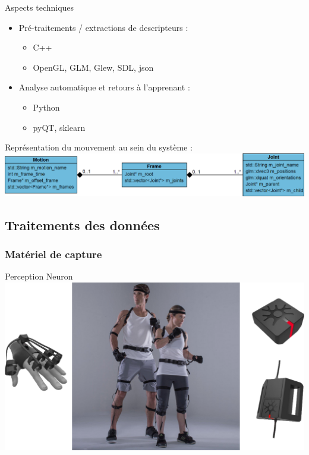 \documentclass[svgnames]{beamer}
\begin{document}
	\begin{frame}{Aspects techniques}
		\begin{itemize}[label=$\bullet$]
			\item Pré-traitements / extractions de descripteurs :
			\begin{itemize}[label=$-$]
				\item C++
				\item OpenGL, GLM, Glew, SDL, json
			\end{itemize}
			\item Analyse automatique et retours à l'apprenant : 
			\begin{itemize}[label=$-$]
				\item Python
				\item pyQT, sklearn
			\end{itemize}
		\end{itemize}		
		\vspace{1cm}
		
		Représentation du mouvement au sein du système :
		\centering
		\includegraphics[scale=0.35]{img/class_diagram_motion_MLA.png}
	\end{frame}

	\subsection{Traitements des données}
	
	\subsubsection{Matériel de capture}
	\begin{frame}{Perception Neuron}
		\centering
		\includegraphics[scale=0.4]{img/Perception_Neuron.png}
	\end{frame}
	
\end{document}

